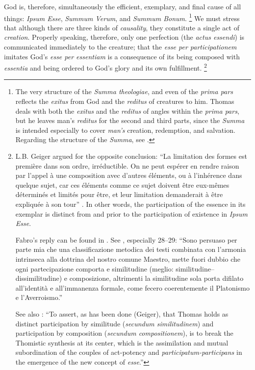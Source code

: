 %
God is, therefore, simultaneously the efficient, exemplary, and final cause of all things: \emph{Ipsum Esse}, \emph{Summum Verum}, and \emph{Summum Bonum}.%
%
\footnote{The very structure of the \emph{Summa theologiae}, and even of the \emph{prima pars} reflects the \emph{exitus} from God and the \emph{reditus} of creatures to him. Thomas deals with both the \emph{exitus} and the \emph{reditus} of angles within the \emph{prima pars}, but he leaves man's \emph{reditus} for the second and third parts, since the \emph{Summa} is intended especially to cover \emph{man's} creation, redemption, and salvation. Regarding the structure of the \emph{Summa}, see \cite{patfoort:unite}.}
%
We must stress that although there are three kinds of \emph{causality}, they constitute a single act of \emph{creation}. Properly speaking, therefore, only one perfection (the \emph{actus essendi}) is communicated immediately to the creature; that the \emph{esse per participationem} imitates God's \emph{esse per essentiam} is a consequence of its being composed with \emph{essentia} and being ordered to God's glory and its own fulfillment.%
%
\footnote{L.B. Geiger argued for the opposite conclusion: ``La limitation des formes est première dans son ordre, irréductible. On ne peut espérer en rendre raison par l’appel à une composition avec d’autres éléments, ou à l’inhérence dans quelque sujet, car ces éléments comme ce sujet doivent être eux-mêmes déterminés et limités pour être, et leur limitation demanderait à être expliquée à son tour'' \parencite[65]{geiger:participation}. In other words, the participation of the essence in its exemplar is distinct from and prior to the participation of existence in \emph{Ipsum Esse}.

Fabro's reply can be found in \cite[52--60]{fabro:partecipazione}. See \cite[26--29]{fabro:nozione}, especially 28--29: ``Sono persuaso per parte mia che una classificazione metodica dei testi combinata con l’armonia intrinseca alla dottrina del nostro comune Maestro, mette fuori dubbio che ogni partecipazione comporta e similitudine (meglio: similitudine--dissimilitudine) e composizione, altrimenti la similitudine sola porta difilato all’identità e all’immanenza formale, come fecero coerentemente il Platonismo e l’Averroismo.''

See also \cite[469]{fabro:intensive}: ``To assert, as has been done (Geiger), that Thomas holds as distinct participation by similitude (\emph{secundum similitudinem}) and participation by composition (\emph{secundum compositionem}), is to break the Thomistic synthesis at its center, which is the assimilation and mutual subordination of the couples of act-potency and \emph{participatum-participans} in the emergence of the new concept of \emph{esse}.'' }%

